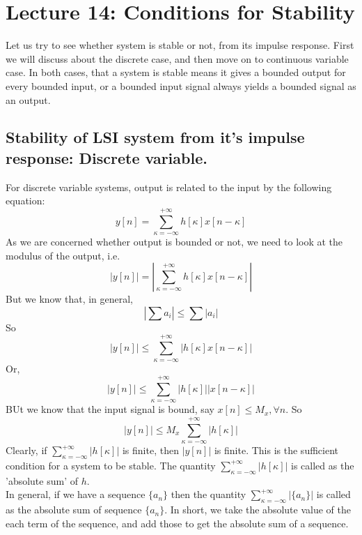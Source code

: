 \section{Lecture 14: Conditions for Stability}



Let us try to see whether system is stable or not, from its impulse response. First we will discuss about the discrete case, and then move on to continuous variable case. In both cases, that a system is stable means it gives a bounded output for every bounded input, or a bounded input signal always yields a bounded signal as an output.
\subsection{Stability of LSI system from it's impulse response: Discrete variable.}
 For discrete variable systems, output is related to the input by the following equation:
\begin{equation}
y[n]=\sum_{\kappa=-\infty}^{+\infty} h[\kappa]x[n-\kappa] \nonumber
\end{equation}
As we are concerned whether output is bounded or not, we need to look at the modulus of the output, i.e.
\begin{equation}
|y[n]|=|\sum_{\kappa=-\infty}^{+\infty} h[\kappa]x[n-\kappa]| \nonumber
\end{equation}
But we know that, in general,
\begin{equation}
|\sum a_{i}| \le \sum|a_{i}| \nonumber
\end{equation}
So 
\begin{equation}
|y[n]|\le\sum_{\kappa=-\infty}^{+\infty} |h[\kappa]x[n-\kappa]| \nonumber
\end{equation}
Or,
\begin{equation}
|y[n]|\le\sum_{\kappa=-\infty}^{+\infty} |h[\kappa]||x[n-\kappa]| \nonumber
\end{equation}
BUt we know that the input signal is bound, say $x[n] \le M_{x}, \forall n$. So
\begin{equation}
|y[n]|\le M_{x}\sum_{\kappa=-\infty}^{+\infty} |h[\kappa]| \nonumber
\end{equation}
Clearly, if $\sum_{\kappa=-\infty}^{+\infty} |h[\kappa]|$ is finite, then $|y[n]|$ is finite. This is the sufficient condition for a system to be stable. The quantity $\sum_{\kappa=-\infty}^{+\infty} |h[\kappa]|$ is called as the 'absolute sum' of $h$.\\
In general, if we have a sequence $\{ a_{n}\}$ then the quantity  $\sum_{\kappa=-\infty}^{+\infty} |\{ a_{n}\}|$ is called as the absolute sum of sequence $\{ a_{n}\}$. In short, we take the absolute value of the each term of the sequence, and add those to get the absolute sum of a sequence.\\
